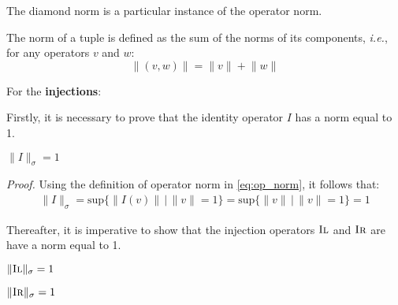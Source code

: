 The diamond norm is a particular instance of the operator norm. 
\vspace{15pt}

  The norm of a tuple is defined as the sum of the norms of its components, \textit{i.e.}, for any operators $v$ and $w$:
\begin{equation} \label{eq:norm_tuple}
  \lVert (v,w) \rVert = \lVert v \rVert + \lVert w \rVert
\end{equation}

For the \textbf{injections}:

Firstly, it is necessary to prove that the identity operator $I$ has a norm equal to 1.
\begin{lemma} \label{lemid}
  $ \lVert I \rVert_{\sigma} = 1   $
\end{lemma}

\textit{Proof.} \quad Using the definition of operator norm in \autoref{eq:op_norm}, it follows that:
\begin{equation} 
\begin{split}
  \lVert I \rVert_{\sigma} = \text{sup} \{\lVert I (v) \rVert \hspace{2pt} \vert \hspace{2pt}  \lVert v\rVert =1 \} = \text{sup} \{\lVert v \rVert \hspace{2pt} \vert \hspace{2pt}  \lVert v\rVert =1 \} = 1
\end{split}
\end{equation}

\vspace{10pt}

Thereafter, it is imperative to show that the injection operators $\textsc{Il}$ and $\textsc{Ir}$ are have a norm equal to 1.

\begin{lemma} \label{lemil}
  $ \lVert \textsc{Il} \rVert_{\sigma} = 1   $
\end{lemma}

\begin{lemma} \label{lemir}
  $ \lVert \textsc{Ir} \rVert_{\sigma} = 1   $
\end{lemma} 

